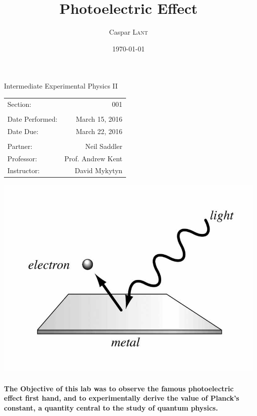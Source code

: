 \documentclass{amsart}
\title{Photoelectric Effect}
\author{Caspar \textsc{Lant}} %
\date{\today} %
\begin{document}
\bigskip

\maketitle %
\begin{center}

Intermediate Experimental Physics II\\
\vspace{1.5cm}

\begin{tabular}{l r}

Section: & 001\\
\\
Date Performed: & March 15, 2016 \\ %
Date Due: & March 22, 2016\\
\\
Partner: & Neil Saddler\\ %
Professor: & Prof. Andrew Kent\\
Instructor: & David Mykytyn %
\end{tabular}
\vfill
\includegraphics[width=.7\textwidth]{diagram.jpg}
\end{center}
\vfill
\pagebreak

\paragraph{\textbf{The Objective} of this lab was to observe the famous photoelectric effect first hand, and to experimentally derive the value of Planck's constant, a quantity central to the study of quantum physics.   }
\end{document}
